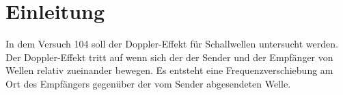 \section{Einleitung}
\label{sec:Einleitung}
In dem Versuch 104 soll der Doppler-Effekt für Schallwellen untersucht werden.
Der Doppler-Effekt tritt auf wenn sich der der Sender und der Empfänger von Wellen
relativ zueinander bewegen.
Es entsteht eine Frequenzverschiebung am Ort des Empfängers gegenüber der vom Sender
abgesendeten Welle.
